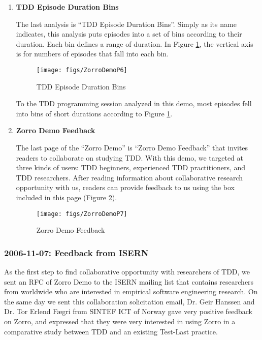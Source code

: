 \begin{enumerate}
\newpage
\item{\textbf{TDD Episode Duration Bins}}

The last analysis is ``TDD Episode Duration Bins''. Simply as its name indicates, this analysis puts episodes into a set of bins according to their duration. Each bin defines a range of duration. In Figure \ref{fig:ZorroDemoP6}, the vertical axis is for numbers of episodes that fall into each bin. 
\begin{figure}[htbp]
  \centering
  \texttt{[image: figs/ZorroDemoP6]}
  \caption{TDD Episode Duration Bins}
  \label{fig:ZorroDemoP6}
\end{figure}

To the TDD programming session analyzed in this demo, most episodes fell into bins of short durations according to Figure \ref{fig:ZorroDemoP6}. 

\clearpage
\item{\textbf{Zorro Demo Feedback}}

The last page of the ``Zorro Demo'' is ``Zorro Demo Feedback'' that invites readers to collaborate on studying TDD. With this demo, we targeted at three kinds of users: TDD beginners, experienced TDD practitioners, and TDD researchers. After reading information about collaborative research opportunity with us, readers can provide feedback to us using the box included in this page (Figure \ref{fig:ZorroDemoP7}). 

\begin{figure}[htbp]
  \centering
  \texttt{[image: figs/ZorroDemoP7]}
  \caption{Zorro Demo Feedback}
  \label{fig:ZorroDemoP7}
\end{figure}

\end{enumerate}

\clearpage
\subsubsection{2006-11-07: Feedback from ISERN}
As the first step to find collaborative opportunity with researchers of TDD, we sent an RFC of Zorro Demo to the ISERN mailing list that contains researchers from worldwide who are interested in empirical software engineering research. On the same day we sent this collaboration solicitation email, Dr. Geir Hanssen and Dr. Tor Erlend F{\ae}gri from SINTEF ICT of Norway gave  very positive feedback on Zorro, and expressed that they were very interested in using Zorro in a comparative study between TDD and an existing Test-Last practice. 

